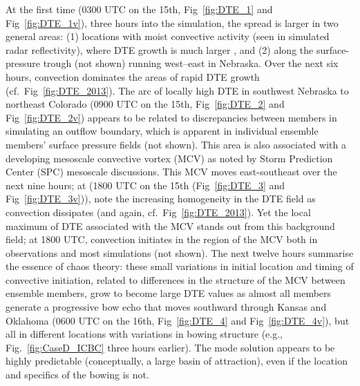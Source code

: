\documentclass{ametsoc}
\begin{document}
{At the first time (0300 UTC on the 15th, Fig~\ref{fig:DTE_1} and Fig~\ref{fig:DTE_1v}), three hours into the simulation, the spread is larger in two general areas: (1) locations with moist convective activity (seen in simulated radar reflectivity), where DTE growth is much larger \citep{Zhang2003-sa}, and (2) along the surface-pressure trough (not shown) running west--east in Nebraska. Over the next six hours, convection dominates the areas of rapid DTE growth (cf.\ Fig~\ref{fig:DTE_2013}). The arc of locally high DTE in southwest Nebraska to northeast Colorado (0900 UTC on the 15th, Fig~\ref{fig:DTE_2} and Fig~\ref{fig:DTE_2v}) appears to be related to discrepancies between members in simulating an outflow boundary, which is apparent in individual ensemble members' surface pressure fields (not shown). This area is also associated with a developing mesoscale convective vortex (MCV) as noted by Storm Prediction Center (SPC) mesoscale discussions. This MCV moves east-southeast over the next nine hours; at (1800 UTC on the 15th (Fig~\ref{fig:DTE_3} and Fig~\ref{fig:DTE_3v})), note the increasing homogeneity in the DTE field as convection dissipates (and again, cf.\ Fig~\ref{fig:DTE_2013}). Yet the local maximum of DTE associated with the MCV stands out from this background field; at 1800 UTC, convection initiates in the region of the MCV both in observations and most simulations (not shown). The next twelve hours summarise the essence of chaos theory: these small variations in initial location and timing of convective initiation, related to differences in the structure of the MCV between ensemble members, grow to become large DTE values as almost all members generate a progressive bow echo that moves southward through Kansas and Oklahoma (0600 UTC on the 16th, Fig~\ref{fig:DTE_4} and Fig~\ref{fig:DTE_4v}), but all in different locations with variations in bowing structure (e.g., Fig.~\ref{fig:CaseD_ICBC} three hours earlier). The mode solution appears to be highly predictable (conceptually, a large basin of attraction), even if the location and specifics of the bowing is not.

}
\end{document}
